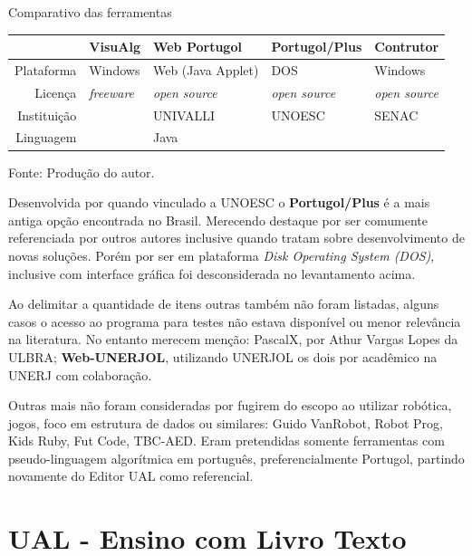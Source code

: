 \begin{quadro}[h]
\centering
  \caption{Comparativo das ferramentas}\label{qua:compare-tools}
\begin{tabular}{| r | l | l | l | l |}\hline
& VisuAlg & Web Portugol & Portugol/Plus & Contrutor \\ \hline
Plataforma & Windows & Web (Java Applet) & DOS & Windows \\ \hline
Licença & \textit{freeware} & \textit{open source} & \textit{open source} & \textit{open source} \\ \hline
Instituição &  & UNIVALLI & UNOESC & SENAC \\ \hline
Linguagem &  & Java &  &  \\ \hline
\end{tabular}
  \caption*{\ifdraft{\color{green}}{}\footnotesize Fonte: Produção do autor.}
\end{quadro}

Desenvolvida por  quando vinculado a UNOESC o \textbf{Portugol/Plus} é a mais antiga opção encontrada no Brasil. Merecendo destaque por ser comumente referenciada por outros autores inclusive quando tratam sobre desenvolvimento de novas soluções. Porém por ser em plataforma \textit{Disk Operating System (DOS)}, inclusive com interface gráfica foi desconsiderada no levantamento acima.

Ao delimitar a quantidade de itens outras também não foram listadas, alguns casos o acesso ao programa para testes não estava disponível ou menor relevância na literatura. No entanto  merecem menção: PascalX, por Athur Vargas Lopes da ULBRA; \textbf{Web-UNERJOL}\nocite{ferrandin2015}, utilizando UNERJOL os dois por acadêmico na UNERJ com colaboração.

Outras mais não foram consideradas por fugirem do escopo ao utilizar robótica, jogos, foco em estrutura de dados ou similares: Guido VanRobot, Robot Prog, Kids Ruby, Fut Code, TBC-AED. Eram pretendidas somente ferramentas com pseudo-linguagem algorítmica em português, preferencialmente Portugol, partindo novamente do Editor UAL como referencial.

\section{UAL - Ensino com Livro Texto}

